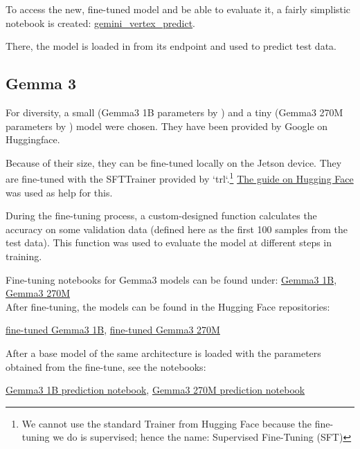 \documentclass{article}
\begin{document}
To access the new, fine-tuned model and be able to evaluate it, a fairly simplistic notebook is created: \href{https://github.com/AntonStantan/matura/blob/main/pre-trained-tranformers/gemini_vertex_predict.ipynb}{gemini\_vertex\_predict}.

There, the model is loaded in from its endpoint and used to predict test data.

\subsection{Gemma 3}
For diversity, a small (Gemma3 1B parameters by \cite{gemma1b_2025}) and a tiny (Gemma3 270M parameters by \cite{gemma270m_2025}) model were chosen. They have been provided by Google on Huggingface.

Because of their size, they can be fine-tuned locally on the Jetson device. They are fine-tuned with the SFTTrainer provided by `trl`.\footnote{We cannot use the standard Trainer from Hugging Face because the fine-tuning we do is supervised; hence the name: Supervised Fine-Tuning (SFT)} \href{https://huggingface.co/docs/trl/en/sft_trainer}{The guide on Hugging Face} was used as help for this.

During the fine-tuning process, a custom-designed function calculates the accuracy on some validation data (defined here as the first 100 samples from the test data). This function was used to evaluate the model at different steps in training.

Fine-tuning notebooks for Gemma3 models can be found under: \href{https://github.com/AntonStantan/matura/blob/main/pre-trained-tranformers/big_gemma_huggingface.ipynb}{Gemma3 1B}, \href{https://github.com/AntonStantan/matura/blob/main/pre-trained-tranformers/gemma_huggingface.ipynb}{Gemma3 270M}
\\[2em]
After fine-tuning, the models can be found in the Hugging Face repositories:

\href{https://huggingface.co/AntonBOOM/big_output}{fine-tuned Gemma3 1B},
\href{https://huggingface.co/AntonBOOM/output1}{fine-tuned Gemma3 270M}

After a base model of the same architecture is loaded with the parameters obtained from the fine-tune, see the notebooks:

\href{https://github.com/AntonStantan/matura/blob/main/pre-trained-tranformers/big_gemma_huggingface_predict.ipynb}{Gemma3 1B prediction notebook},
\href{https://github.com/AntonStantan/matura/blob/main/pre-trained-tranformers/gemma-huggingface-predict.ipynb}{Gemma3 270M prediction notebook}
\end{document}
